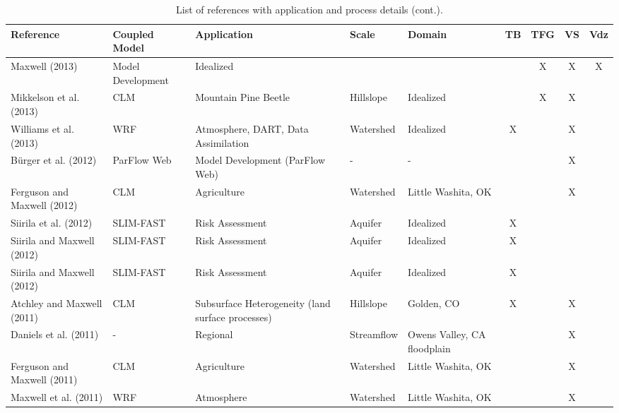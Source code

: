 {\begin{table} \center
\renewcommand{\arraystretch}{2.5}
\center
\caption{List of \parflow{} references with application and process details (cont.).}

\begin{tabular}{ l  p{1.5cm} p{2cm} p{1.5cm} p{1.5cm} | c | c | c | c }
\bf{Reference} & \bf{Coupled Model} & \bf{Application} & \bf{Scale} & \bf{Domain} & \bf{TB} & \bf{TFG} & \bf{VS} & \bf{Vdz} \\   
\hline{}

\cite{M13} Maxwell (2013) & Model Development & Idealized &   &   &   & X & X & X   \\
\cite{Mikkelson13} Mikkelson et al. (2013) & CLM & Mountain Pine Beetle & Hillslope & Idealized &   & X & X &     \\
\cite{Williams13} Williams et al. (2013) & WRF & Atmosphere, DART, Data Assimilation & Watershed & Idealized & X &   & X &     \\
\cite{Burger12} B{\"u}rger et al. (2012) & ParFlow Web & Model Development (ParFlow Web)& - & - &   &   & X &     \\
\cite{Ferg12} Ferguson and Maxwell (2012) & CLM & Agriculture & Watershed & Little Washita, OK  &   &   & X &     \\
\cite{SNSMM10} Siirila et al. (2012) & SLIM-FAST & Risk Assessment & Aquifer & Idealized  & X &   &   &     \\
\cite{Siirila12a} Siirila and Maxwell (2012) & SLIM-FAST & Risk Assessment & Aquifer & Idealized  & X &   &   &     \\
\cite{Siirila12b} Siirila and Maxwell (2012) & SLIM-FAST & Risk Assessment & Aquifer & Idealized  & X &   &   &     \\
\cite{AM10} Atchley and Maxwell (2011) & CLM & Subsurface Heterogeneity (land surface processes) & Hillslope & Golden, CO  & X &   & X &     \\
\cite{DMC10} Daniels et al. (2011) & - & Regional & Streamflow & Owens Valley, CA floodplain  &   &   & X &     \\
\cite{Ferg11} Ferguson and Maxwell (2011) & CLM & Agriculture & Watershed & Little Washita, OK  &   &   & X &     \\
\cite{MLMSWT10} Maxwell et al. (2011) & WRF & Atmosphere & Watershed  & Little Washita, OK  &   &   & X &     \\
\end{tabular}
\label{pfref2}
\end{table}

}

